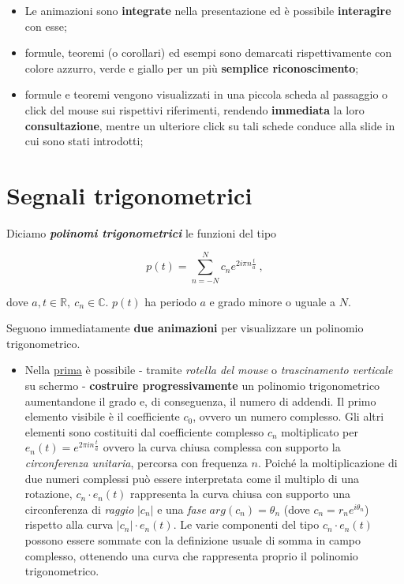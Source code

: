 \documentclass[
]{book}
\providecommand{\tightlist}{%
  \setlength{\itemsep}{0pt}\setlength{\parskip}{0pt}}
\begin{document}
\begin{itemize}
\tightlist
\item
  Le animazioni sono \textbf{integrate} nella presentazione ed è possibile \textbf{interagire} con esse;
\item
  formule, teoremi (o corollari) ed esempi sono demarcati rispettivamente con colore azzurro, verde e giallo per un più \textbf{semplice riconoscimento};
\item
  formule e teoremi vengono visualizzati in una piccola scheda al passaggio o click del mouse sui rispettivi riferimenti, rendendo \textbf{immediata} la loro \textbf{consultazione}, mentre un ulteriore click su tali schede conduce alla slide in cui sono stati introdotti;
\end{itemize}

\hypertarget{segntrig}{%
\section{Segnali trigonometrici}\label{segntrig}}

Diciamo \emph{\textbf{polinomi trigonometrici}} le funzioni del tipo

\begin{equation}
  p(t) = \sum_{n=-N}^N c_n e^{2 i \pi n \textstyle \frac {t}{a}} \ ,
  \label{eq:poltrig}
\end{equation}

dove \(a,t \in \mathbb{R}, \ c_n \in \mathbb{C}\). \(p(t)\) ha periodo \(a\) e grado minore o uguale a \(N\).

Seguono immediatamente \textbf{due animazioni} per visualizzare un polinomio trigonometrico.

\begin{itemize}
\tightlist
\item
  Nella \href{https://bradwave.github.io/thesis/\#/animazione-polinomi-trigonometrici}{prima} è possibile - tramite \emph{rotella del mouse} o \emph{trascinamento verticale} su schermo - \textbf{costruire progressivamente} un polinomio trigonometrico aumentandone il grado e, di conseguenza, il numero di addendi.
  Il primo elemento visibile è il coefficiente \(c_0\), ovvero un numero complesso. Gli altri elementi sono costituiti dal coefficiente complesso \(c_n\) moltiplicato per \(e_n(t)=e^{2\pi in\frac{t}{a}}\) ovvero la curva chiusa complessa con supporto la \emph{circonferenza unitaria}, percorsa con frequenza \(n\). Poiché la moltiplicazione di due numeri complessi può essere interpretata come il multiplo di una rotazione, \(c_n \cdot e_n(t)\) rappresenta la curva chiusa con supporto una circonferenza di \emph{raggio} \(|c_n|\) e una \emph{fase} \(arg(c_n)=\theta_n\) (dove \(c_n=r_{n}e^{i\theta_n}\)) rispetto alla curva \(|c_n| \cdot e_n(t)\).
  Le varie componenti del tipo \(c_n \cdot e_n(t)\) possono essere sommate con la definizione usuale di somma in campo complesso, ottenendo una curva che rappresenta proprio il polinomio trigonometrico.
\end{itemize}
\end{document}
